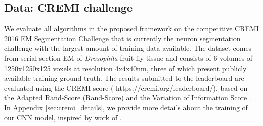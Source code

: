 \subsection{Data: CREMI challenge} \label{sec:cremi_challenge}
We evaluate all algorithms in the proposed framework on the competitive CREMI 2016 EM Segmentation Challenge \cite{cremiChallenge} that is currently the neuron segmentation challenge with the largest amount of training data available. The dataset comes from serial section EM of \emph{Drosophila} fruit-fly tissue and consists of 6 volumes of 1250x1250x125 voxels at resolution 4x4x40nm, three of which present publicly available training ground truth. The results submitted to the leaderboard are evaluated using the CREMI score ( https://cremi.org/leaderboard/), based on the Adapted Rand-Score (Rand-Score) and the Variation of Information Score \cite{arganda2015crowdsourcing}. In Appendix \ref{sec:cremi_details}, we provide more details about the training of our CNN model, inspired by work of \cite{lee2017superhuman,funke2018large}.

